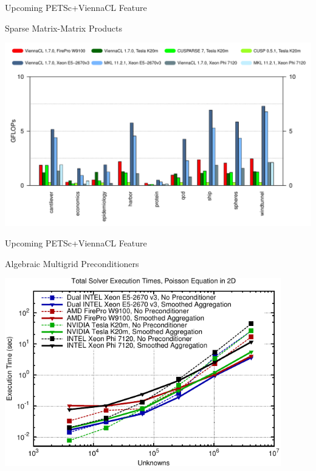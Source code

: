 \begin{frame}{Upcoming PETSc+ViennaCL Feature}
  \begin{block}{Sparse Matrix-Matrix Products}
    \vspace*{-.6cm}
   \begin{center}
    \hspace*{-.2cm}\includegraphics[width=1.05\textwidth]{figures/spgemm}
   \end{center}
  \end{block}
\end{frame}


\begin{frame}{Upcoming PETSc+ViennaCL Feature}
  \begin{block}{Algebraic Multigrid Preconditioners}
  \vspace*{-.2cm}
   \begin{center}
    \includegraphics[width=0.9\textwidth]{figures/amg-vs-pure-full-2d}
   \end{center}
  \end{block}
\end{frame}


